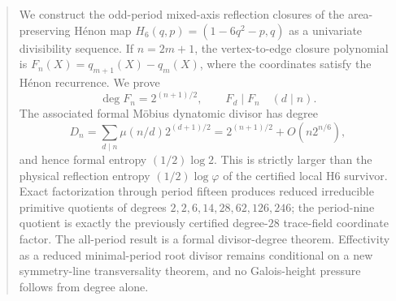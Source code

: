 \begin{abstract}
We construct the odd-period mixed-axis reflection closures of the
area-preserving H\'enon map $H_6(q,p)=(1-6q^2-p,q)$ as a univariate
divisibility sequence.  If $n=2m+1$, the vertex-to-edge closure polynomial is
$F_n(X)=q_{m+1}(X)-q_m(X)$, where the coordinates satisfy the H\'enon
recurrence.  We prove
\[
\deg F_n=2^{(n+1)/2},\qquad F_d\mid F_n\quad(d\mid n).
\]
The associated formal M\"obius dynatomic divisor has degree
\[
D_n=\sum_{d\mid n}\mu(n/d)2^{(d+1)/2}
   =2^{(n+1)/2}+O(n2^{n/6}),
\]
and hence formal entropy $(1/2)\log2$.  This is strictly larger than the
physical reflection entropy $(1/2)\log\varphi$ of the certified local H6
survivor.  Exact factorization through period fifteen produces reduced
irreducible primitive quotients of degrees
$2,2,6,14,28,62,126,246$; the period-nine quotient is exactly the previously
certified degree-$28$ trace-field coordinate factor.  The all-period result is
a formal divisor-degree theorem.  Effectivity as a reduced minimal-period
root divisor remains conditional on a new symmetry-line transversality
theorem, and no Galois-height pressure follows from degree alone.
\end{abstract}
